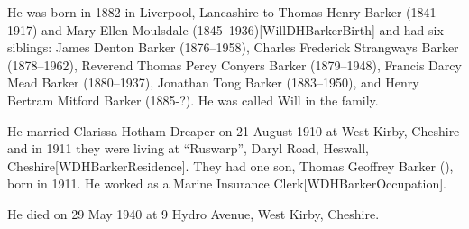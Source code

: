 
He was born in 1882 in Liverpool, Lancashire to Thomas Henry Barker (1841--1917) and Mary Ellen Moulsdale (1845--1936)[WillDHBarkerBirth] and had six siblings: James Denton Barker (1876--1958),  Charles Frederick Strangways Barker (1878--1962), Reverend Thomas Percy Conyers Barker (1879--1948), Francis Darcy Mead Barker (1880--1937), Jonathan Tong Barker (1883--1950), and Henry Bertram Mitford Barker (1885-?). He was called Will in the family.

He married Clarissa Hotham Dreaper {} on 21 August 1910 at West Kirby, Cheshire\cite{CheshireParishRegisters} and in 1911 they were living at ``Ruswarp'', Daryl Road, Heswall, Cheshire[WDHBarkerResidence].  They had one son, Thomas Geoffrey Barker (), born in 1911.  He worked as a Marine Insurance Clerk[WDHBarkerOccupation].

He died on 29 May 1940 at 9 Hydro Avenue, West Kirby, Cheshire.
